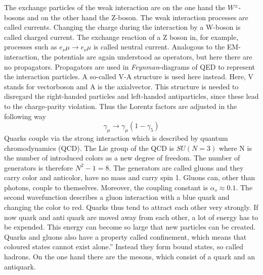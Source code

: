 The exchange particles of the weak interaction are on the one hand the $W^{\pm}$-bosons and on the other hand the Z-boson.
The weak interaction processes are called currents.
Changing the charge during the interaction by a W-boson is called charged current.
The exchange reaction of a Z boson in, for example, processes such as $e_{\nu} \mu \to e_{\nu} \mu$ is called neutral current.
Analogous to the EM-interaction, the potentials are again understood as
operators, but here there are no propagators. Propagators are
used in \textit{Feynman}-diagrams of QED to represent the interaction particles.
A so-called V-A structure is used here instead. Here, V stands for vectorboson and A is the axialvector.
This structure is needed to disregard the right-handed particles and left-handed
antiparticles, since these lead to the charge-parity violation. Thus the Lorentz factors are adjusted in the following way
\begin{equation*}
  \gamma_{\mu} \to \gamma_{\mu}(1 - \gamma_5)
\end{equation*}
Quarks couple via the strong interaction which is described by quantum chromodynamics (QCD). The Lie group of the QCD is $SU\left(N = 3\right)$ where N is the number of introduced colors as a new degree of freedom. The number of generators is therefore $N^2 - 1 = 8$.
The generators are called gluons and they carry color and anticolor, have no mass and carry spin 1.
Gluons can, other than photons, couple to themselves.
Moreover, the coupling constant is $\alpha_s \approx 0.1$.
The second wavefunction describes a gluon interaction with a blue quark and changing the color to red.
Quarks thus tend to attract each other very strongly. If now
quark and anti quark are moved away from each other, a lot of energy has to be expended. This energy can become so large that new particles can be created.
Quarks and gluons also have a property called confinement, which means that coloured states cannot exist alone.” Instead they form bound states, so called hadrons. On the one hand there are the mesons, which consist of a quark
and an antiquark.

